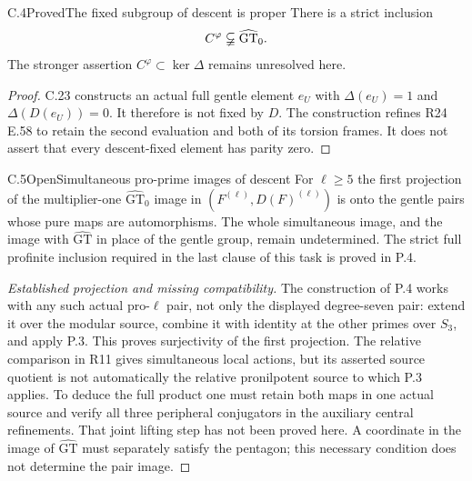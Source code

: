 \begin{statement}{C.4}{Proved}{The fixed subgroup of descent is proper}
There is a strict inclusion
\[
                 C^\varphi\varsubsetneqq\widehat{\mathrm{GT}}_0.
\]
The stronger assertion $C^\varphi\subset\ker\Delta$
remains unresolved here.
\end{statement}
\begin{proof}
C.23 constructs an actual full gentle element $e_U$ with
$\Delta(e_U)=1$ and $\Delta(D(e_U))=0$.
It therefore is not fixed by $D$. The construction refines
R24 E.58 to retain the second evaluation and both of its
torsion frames. It does not assert that every descent-fixed
element has parity zero.
\end{proof}

\begin{statement}{C.5}{Open}{Simultaneous pro-prime images of descent}
For $\ell\geq5$ the first projection of the multiplier-one
$\widehat{\mathrm{GT}}_0$ image in
$(F^{(\ell)},D(F)^{(\ell)})$ is onto the gentle pairs whose pure
maps are automorphisms. The whole simultaneous image, and the image
with $\widehat{\mathrm{GT}}$ in place of the gentle group, remain
undetermined. The strict full profinite inclusion required in the
last clause of this task is proved in P.4.
\end{statement}
\begin{proof}[Established projection and missing compatibility]
The construction of P.4 works with any such actual pro-$\ell$ pair,
not only the displayed degree-seven pair: extend it over the modular
source, combine it with identity at the other primes over $S_3$,
and apply P.3. This proves surjectivity of the first projection.
The relative comparison in R11 gives simultaneous local actions,
but its asserted source quotient is not automatically the relative
pronilpotent source to which P.3 applies. To deduce the full product
one must retain both maps in one actual source and verify all three
peripheral conjugators in the auxiliary central refinements. That
joint lifting step has not been proved here. A coordinate in the
image of $\widehat{\mathrm{GT}}$ must separately satisfy the pentagon;
this necessary condition does not determine the pair image.
\end{proof}

